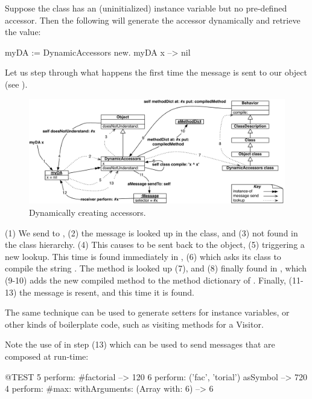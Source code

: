 \documentclass[a4paper,10pt,twoside]{book}
\begin{document}
Suppose the class  has an (uninitialized) instance variable  but no pre-defined accessor. Then the following will generate the accessor dynamically and retrieve the value:
\begin{code}{}
myDA := DynamicAccessors new.
myDA x --> nil
\end{code}

Let us step through what happens the first time the message  is sent to our object (see ).

\begin{figure}[ht]\centering
	\includegraphics[width=\linewidth]{DynamicAccessors}
	\caption{Dynamically creating accessors.\label{fig:DynamicAccessors}}
\end{figure}

(1) We send  to , (2) the message is looked up in the class, and (3) not found in the class hierarchy. (4) This causes  to be sent back to the object, (5) triggering a new lookup. This time  is found immediately in , (6) which asks its class to compile the string . The  method is looked up (7), and (8) finally found in , which (9-10) adds the new compiled method to the method dictionary of . Finally, (11-13) the message is resent, and this time it is found.

The same technique can be used to generate setters for instance variables, or other kinds of boilerplate code, such as visiting methods for a Visitor.

Note the use of  in step (13) which can be used to send messages that are composed at run-time:

\begin{code}{@TEST}
5 perform: #factorial                                             --> 120
6 perform: ('fac', 'torial') asSymbol                       --> 720
4 perform: #max: withArguments: (Array with: 6) --> 6
\end{code}
\end{document}

